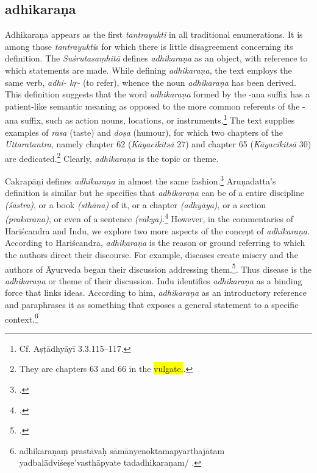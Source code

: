 \subsection{adhikaraṇa}

Adhikaraṇa appears as the first \emph{tantrayukti} in all traditional enumerations. It is among those \emph{tantrayukti}s for which there is little disagreement concerning its definition. The \emph{Suśrutasaṃhitā} defines \emph{adhikaraṇa} as an object, with reference to which statements are made. While defining \emph{adhikaraṇa}, the text employs the same verb, \emph{adhi- kṛ-} (to refer), whence the noun \emph{adhikaraṇa} has been derived. This definition suggests that the word \emph{adhikaraṇa} formed by the -ana suffix has a patient-like semantic meaning as opposed to the more common referents of the -ana suffix, such as action nouns, locations, or instruments.\footnote{Cf. Aṣṭādhyāyī 3.3.115--117.} The text supplies examples of \emph{rasa} (taste) and \emph{doṣa} (humour), for which two chapters of the \emph{Uttaratantra}, namely chapter 62 (\emph{Kāyacikitsā} 27) and  chapter 65 (\emph{Kāyacikitsā} 30) are dedicated.\footnote{They are chapters 63 and 66 in the \colorbox{yellow}{vulgate.}.} Clearly, \emph{adhikaraṇa} is the topic or theme. 

Cakrapāṇi defines \emph{adhikaraṇa} in almost the same fashion.\footnote{ \parencite[736]{cara-trikamji3}.}
Aruṇadatta's definition is similar but he specifies that \emph{adhikaraṇa} can be of a entire discipline \emph{(śāstra)}, or a book \emph{(sthāna)} of it, or a chapter \emph{(adhyāya)}, or a section \emph{(prakaraṇa)}, or even of a sentence \emph{(vākya)}.\footnote{ \parencite[947]{kunt-1939}.} 
However, in the commentaries of Hariścandra and Indu, we explore two more aspects of the concept of \emph{adhikaraṇa}. According to Hariścandra, \emph{adhikaraṇa} is the reason or ground referring to which the authors direct their discourse. For example, diseases create misery and the authors of Āyurveda began their discussion addressing them.\footnote{.}.
Thus disease is the \emph{adhikaraṇa} or theme of their discussion. Indu identifies \emph{adhikaraṇa} as a binding force that links ideas. According to him, \emph{adhikaraṇa} as an introductory reference and paraphrases it as something that exposes a general statement to a specific context.\footnote{adhikaraṇaṃ prastāvaḥ sāmānyenoktamapyarthajātam yadbalādviśeṣe'vasthāpyate tadadhikaraṇam/ \parencite[959]{atha-1980}.} 

